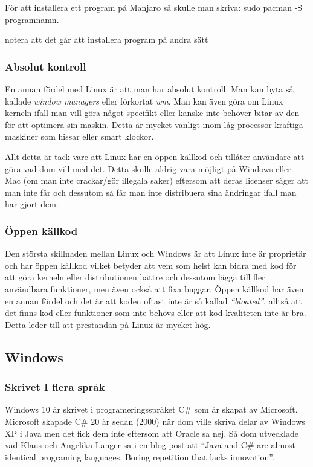 \documentclass[12pt, a4paper]{report}
\begin{document}
    För att installera ett program på Manjaro så skulle man skriva: sudo pacman -S programnamn. 

    \small{notera att det går att installera program på andra sätt}


    \subsubsection{Absolut kontroll}

   En annan fördel med Linux är att man har absolut kontroll. Man kan byta så kallade \textit{window managers} eller förkortat \textit{wm}\cite{wm}. Man kan även göra om Linux kerneln ifall man vill göra något specifikt eller kanske inte behöver bitar av den för att optimera sin maskin. Detta är mycket vanligt inom låg processor kraftiga maskiner som hissar eller smart klockor.

   Allt detta är tack vare att Linux har en öppen källkod och tillåter användare att göra vad dom vill med det. Detta skulle aldrig vara möjligt på Windows eller Mac (om man inte crackar/gör illegala saker) eftersom att deras licenser säger att man inte får och dessutom så får man inte distribuera sina ändringar ifall man har gjort dem.

   \subsubsection{Öppen källkod}


   Den största skillnaden mellan Linux och Windows är att Linux inte är proprietär och har öppen källkod vilket betyder att vem som helst kan bidra med kod för att göra kerneln eller distributionen bättre och dessutom lägga till fler användbara funktioner, men även också att fixa buggar. Öppen källkod har även en annan fördel och det är att koden oftast inte är så kallad \textit{``bloated''}, alltså att det finns kod eller funktioner som inte behövs eller att kod kvaliteten inte är bra. Detta leder till att prestandan på Linux är mycket hög.

   \subsection{Windows}


    \subsubsection{Skrivet I flera språk}
    
    Windows 10 är skrivet i programeringsspråket C\# som är skapat av Microsoft\cite{c}. Microsoft skapade C\# 20 år sedan (2000) när dom ville skriva delar av Windows XP i Java men det fick dem inte eftersom att Oracle sa nej. Så dom utvecklade  vad Klaus och Angelika Langer sa i en blog post att ``Java and C\# are almost identical programing languages. Boring repetition that lacks innovation''.\cite{cquote}  
    
\end{document}
